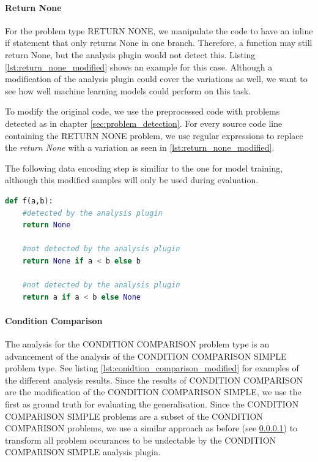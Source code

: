 \paragraph{Return None}\label{par:manipulation_return_none}
For the problem type RETURN NONE, we manipulate the code to have an inline if statement that only returns None in one branch. Therefore, a function may still return None, but the analysis plugin would not detect this. Listing \ref{lst:return_none_modified} shows an example for this case. Although a modification of the analysis plugin could cover the variations as well, we want to see how well machine learning models could perform on this task.

To modify the original code, we use the preprocessed code with problems detected as in chapter \ref{sec:problem_detection}. For every source code line containing the RETURN NONE problem, we use regular expressions to replace the \textit{return None} with a variation as seen in \ref{lst:return_none_modified}. 

The following data encoding step is similiar to the one for model training, although this modified samples will only be used during evaluation.

\begin{minipage}[c]{\linewidth}
\begin{lstlisting}[language=Python, label=lst:return_none_modified, caption={Samples for returning None. The first return would be flagged by the analysis plugin, the second and third return are modified variations that would be ignored by the analysis plugin. The performance of the machine learning models on detecting the latter will be evaluated.}]
def f(a,b):
    #detected by the analysis plugin
    return None 

    #not detected by the analysis plugin
    return None if a < b else b 

    #not detected by the analysis plugin
    return a if a < b else None \end{lstlisting}
\end{minipage}
\paragraph{Condition Comparison}
The analysis for the CONDITION COMPARISON problem type is an advancement of the analysis of the CONDITION COMPARISON SIMPLE problem type.  See listing \ref{lst:conidtion_comparison_modified} for examples of the different analysis results.
Since the results of CONDITION COMPARISON are the modification of the CONDITION COMPARISON SIMPLE, we use the first as ground truth for evaluating the generalisation. Since the CONDITION COMPARISON SIMPLE problems are a subset of the CONDITION COMPARISON problems, we use a similar approach as before (see \ref{par:manipulation_return_none}) to transform all problem occurances to be undectable by the CONDITION COMPARISON SIMPLE analysis plugin.

